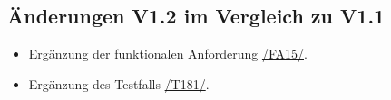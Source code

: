 \subsection*{Änderungen V1.2 im Vergleich zu V1.1}

\begin{itemize}
    \item Ergänzung der funktionalen Anforderung \hyperref[/FA15/]{/FA15/}.
    \item Ergänzung des Testfalls \hyperref[/T181/]{/T181/}.
\end{itemize}